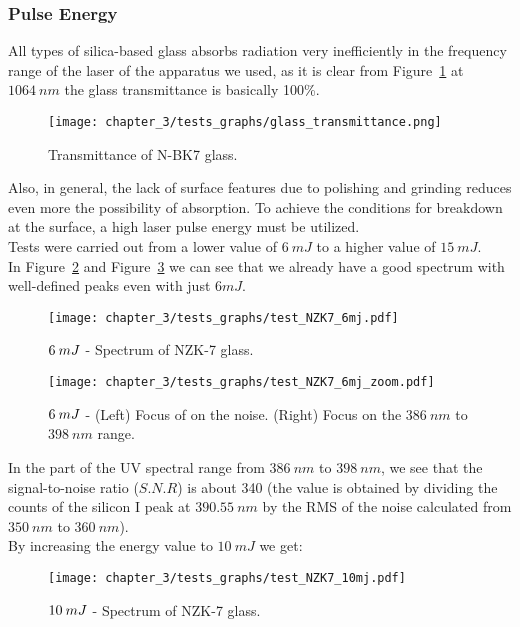 \subsubsection{Pulse Energy}
\label{subsubsec:pulse_energy}
All types of silica-based glass absorbs radiation very inefficiently in the frequency range of the laser of the apparatus we used, as it is clear from Figure~\ref{fig:glass_transmittance} at $1064 \: nm$ the glass transmittance is basically 100\%. 
\begin{figure}[H]
    \centering
    \texttt{[image: chapter\_3/tests\_graphs/glass\_transmittance.png]} 
    \caption{Transmittance of N-BK7 glass. \cite{HttpsWwwSchott}}
    \label{fig:glass_transmittance}
 \end{figure}
 Also, in general, the lack of surface features due to polishing and grinding reduces even more the possibility of absorption. To achieve the conditions for breakdown at the surface, a high laser pulse energy must be utilized.
 \\
Tests were carried out from a lower value of $6 \:mJ$ to a higher value of $15\: mJ$.
\\
In Figure~\ref{fig:test_NZK7_6mj} and Figure~\ref{fig:test_NZK7_6mj_zoom} we can see that we already have a good spectrum with well-defined peaks even with just $6 mJ$.
\begin{figure}[H]
    \centering
    \texttt{[image: chapter\_3/tests\_graphs/test\_NZK7\_6mj.pdf]} 
     \vspace*{-30pt}
    \caption{$\protect 6 \: mJ$ - Spectrum of NZK-7 glass.}
    \label{fig:test_NZK7_6mj}
\end{figure}
\begin{figure}[H]
    \centering
    \texttt{[image: chapter\_3/tests\_graphs/test\_NZK7\_6mj\_zoom.pdf]} 
     \vspace*{-30pt}
    \caption{$\protect 6 \: mJ$ - (Left) Focus of on the noise. (Right) Focus on the $386 \: nm$ to $398 \: nm$ range.}
    \label{fig:test_NZK7_6mj_zoom}
 \end{figure}
In the part of the UV spectral range from $386 \: nm$ to $398 \: nm$, we see that the signal-to-noise ratio ($S.N.R$) is about 340 (the value is obtained by dividing the counts of the silicon I peak at $390.55 \: nm$ by the RMS of the noise calculated from $350 \: nm$ to $360 \: nm$).
\\
By increasing the energy value to $10 \: mJ$ we get:
\begin{figure}[H]
    \centering
    \texttt{[image: chapter\_3/tests\_graphs/test\_NZK7\_10mj.pdf]} 
     \vspace*{-30pt}
    \caption{$\protect 10 \: mJ$ - Spectrum of NZK-7 glass.}
    \label{fig:test_NZK7_10mj}
\end{figure}

